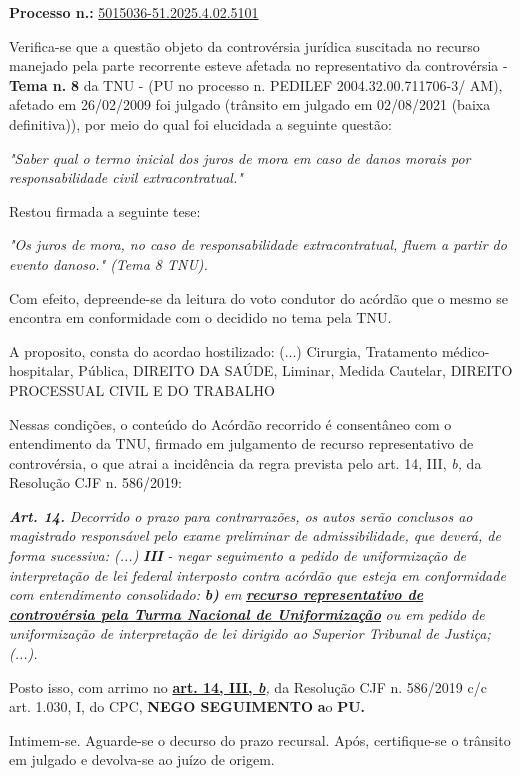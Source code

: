 \documentclass[12pt]{article}
\begin{document}
\justifying
\noindent \textbf{Processo n.: }\uline{5015036-51.2025.4.02.5101}

\noindent Verifica-se que a questão objeto da controvérsia jurídica suscitada no recurso manejado pela parte recorrente esteve afetada no representativo da controvérsia - \textbf{Tema n. }\textbf{8} da TNU - (PU no processo n. PEDILEF 2004.32.00.711706-3/ AM),  afetado em 26/02/2009 foi julgado (trânsito em julgado em 02/08/2021 (baixa definitiva)), por meio do qual foi elucidada a seguinte questão:

{\leftskip=3.1cm\rightskip=0.8cm\parindent=0pt \textit{"Saber qual o termo inicial dos juros de mora em caso de danos morais por responsabilidade civil extracontratual."}\par}

\noindent Restou firmada a seguinte tese:

{\leftskip=3.1cm\rightskip=0.8cm\parindent=0pt \textit{"Os juros de mora, no caso de responsabilidade extracontratual, fluem a partir do evento danoso." (Tema 8 TNU).}\par}

\noindent Com efeito, depreende-se da leitura do voto condutor do acórdão que o mesmo se encontra em conformidade com o decidido no  tema pela TNU.

\noindent A proposito, consta do acordao hostilizado: (...) Cirurgia, Tratamento médico-hospitalar, Pública, DIREITO DA SAÚDE, Liminar, Medida Cautelar, DIREITO PROCESSUAL CIVIL E DO TRABALHO

\noindent Nessas condições, o conteúdo do Acórdão recorrido é consentâneo com o entendimento da TNU, firmado em julgamento de recurso representativo de controvérsia, o que atrai a incidência da regra prevista pelo art. 14, III, \textit{b,} da Resolução CJF n. 586/2019:

\noindent \textit{\textbf{Art. 14.}}\textit{ Decorrido o prazo para contrarrazões, os autos serão conclusos ao magistrado responsável pelo exame preliminar de admissibilidade, que deverá, de forma sucessiva: (...) }\textit{\textbf{III }}\textit{- negar seguimento a pedido de uniformização de interpretação de lei federal interposto contra acórdão que esteja em conformidade com entendimento consolidado: }\textit{\textbf{b)}}\textit{ em }\textit{\textbf{\uline{recurso representativo de controvérsia pela Turma Nacional de Uniformização}}}\textit{ ou em pedido de uniformização de interpretação de lei dirigido ao Superior Tribunal de Justiça;(...).}

\noindent Posto isso, com arrimo no \textbf{\uline{art. 14, III, }}\textit{\textbf{\uline{b}}}\textit{,} da Resolução CJF n. 586/2019 c/c art. 1.030, I, do CPC, \textbf{NEGO SEGUIMENTO }\textbf{a}o\textbf{ PU}\textbf{.}

\noindent Intimem-se. Aguarde-se o decurso do prazo recursal. Após, certifique-se o trânsito em julgado e devolva-se ao juízo de origem.
\end{document}
